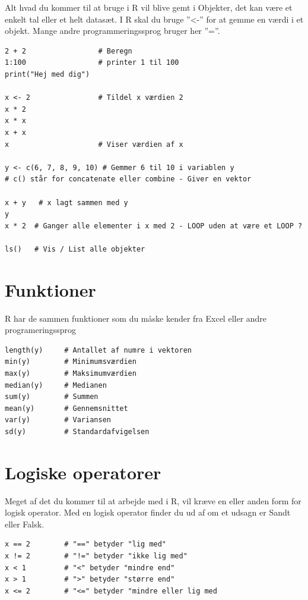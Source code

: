 \documentclass[
]{book}
\begin{document}
Alt hvad du kommer til at bruge i R vil blive gemt i Objekter, det kan være et enkelt tal eller et helt datasæt.
I R skal du bruge ''\textless-'' for at gemme en værdi i et objekt. Mange andre programmeringssprog bruger her ''=''.

\begin{verbatim}
2 + 2                 # Beregn
1:100                 # printer 1 til 100
print("Hej med dig")

x <- 2                # Tildel x værdien 2
x * 2
x * x
x + x
x                     # Viser værdien af x

y <- c(6, 7, 8, 9, 10) # Gemmer 6 til 10 i variablen y
# c() står for concatenate eller combine - Giver en vektor

x + y   # x lagt sammen med y
y
x * 2  # Ganger alle elementer i x med 2 - LOOP uden at være et LOOP ?

ls()   # Vis / List alle objekter
\end{verbatim}

\hypertarget{funktioner}{%
\section{Funktioner}\label{funktioner}}

R har de sammen funktioner som du måske kender fra Excel eller andre programeringssprog

\begin{verbatim}
length(y)     # Antallet af numre i vektoren
min(y)        # Minimumsværdien
max(y)        # Maksimumværdien
median(y)     # Medianen
sum(y)        # Summen
mean(y)       # Gennemsnittet
var(y)        # Variansen
sd(y)         # Standardafvigelsen
\end{verbatim}

\hypertarget{logiske-operatorer}{%
\section{Logiske operatorer}\label{logiske-operatorer}}

Meget af det du kommer til at arbejde med i R, vil kræve en eller anden form for logisk operator. Med en logisk operator finder du ud af om et udsagn er Sandt eller Falsk.

\begin{verbatim}
x == 2        # "==" betyder "lig med"
x != 2        # "!=" betyder "ikke lig med"
x < 1         # "<" betyder "mindre end"
x > 1         # ">" betyder "større end"
x <= 2        # "<=" betyder "mindre eller lig med
\end{verbatim}
\end{document}
